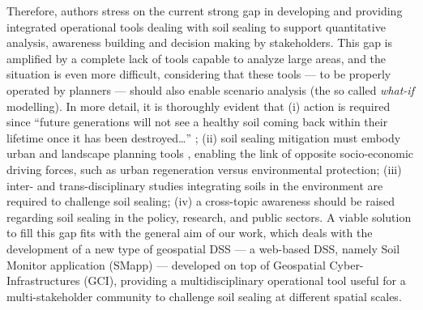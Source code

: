 \documentclass[APA,LATO1COL,doublespace]{WileyNJD-v2}
\newcommand{\toberevised}[1]{\emph{\textcolor{red}{#1}}} %
\newcommand{\reviewer}[1]{\emph{\textcolor{cyan}{#1}}}   %
\begin{document}
Therefore, authors stress on the current
strong gap in developing and providing integrated operational tools 
dealing with soil sealing 
to support quantitative analysis, awareness building and decision making by stakeholders.
This gap is amplified by a complete lack of tools 
capable to analyze large areas, and the situation is even more difficult, considering that these tools --- to be properly operated by planners --- should also enable scenario analysis (the so called \textit{what-if} modelling).
In more detail, it is thoroughly evident that 
(i) action is required since ``future generations will not see a healthy soil coming back within their lifetime once it has been destroyed\dots'' \citep{SWD12}; 
(ii) soil sealing mitigation must embody urban and landscape planning tools \citep{Artmann14}, enabling the link of opposite socio-economic driving forces, such as urban regeneration versus environmental protection; 
(iii) inter- and trans-disciplinary studies integrating soils in the environment are required to challenge soil sealing;
(iv) a cross-topic awareness should be raised regarding soil sealing in the policy, research, and public sectors.
A viable solution to fill this gap fits with the general aim of our work, which deals with the development of
a new type of geospatial DSS --- a web-based DSS, namely Soil Monitor application (SMapp) --- developed on top of Geospatial Cyber-Infrastructures (GCI), providing a multidisciplinary operational tool useful for a multi-stakeholder community to challenge soil sealing at different spatial scales.

\end{document}
